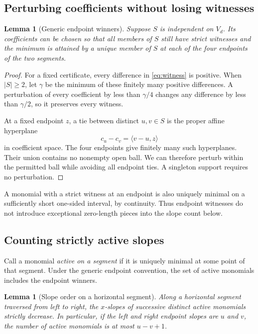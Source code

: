 \documentclass[11pt,a4paper]{article}
\numberwithin{equation}{section}
\newtheorem{lemma}[theorem]{Lemma}
\theoremstyle{definition}
\theoremstyle{remark}
\newcommand{\ip}[2]{\langle #1,#2\rangle}
\begin{document}
\subsection{Perturbing coefficients without losing witnesses}

\begin{lemma}[Generic endpoint winners]
\label{lem:perturb}
Suppose $S$ is independent on $V_d$. Its coefficients can be chosen so that
all members of $S$ still have strict witnesses and the minimum is attained by
a unique member of $S$ at each of the four endpoints of the two segments.
\end{lemma}

\begin{proof}
For a fixed certificate, every difference in \eqref{eq:witness} is positive.
When $|S|\geq2$, let $\gamma$ be the minimum of these finitely many positive
differences. A perturbation of every coefficient by less than $\gamma/4$
changes any difference by less than $\gamma/2$, so it preserves every witness.

At a fixed endpoint $z$, a tie between distinct $u,v\in S$ is the proper affine
hyperplane
\[
c_u-c_v=\ip{v-u}{z}
\]
in coefficient space. The four endpoints give finitely many such hyperplanes.
Their union contains no nonempty open ball. We can therefore perturb within
the permitted ball while avoiding all endpoint ties. A singleton support
requires no perturbation.
\end{proof}

A monomial with a strict witness at an endpoint is also uniquely minimal on
a sufficiently short one-sided interval, by continuity. Thus endpoint
witnesses do not introduce exceptional zero-length pieces into the slope
count below.

\subsection{Counting strictly active slopes}

Call a monomial \emph{active on a segment} if it is uniquely minimal at some
point of that segment. Under the generic endpoint convention, the set of
active monomials includes the endpoint winners.

\begin{lemma}[Slope order on a horizontal segment]
\label{lem:slopes}
Along a horizontal segment traversed from left to right, the $x$-slopes of
successive distinct active monomials strictly decrease. In particular, if the
left and right endpoint slopes are $u$ and $v$, the number of active monomials
is at most $u-v+1$.
\end{lemma}
\end{document}
